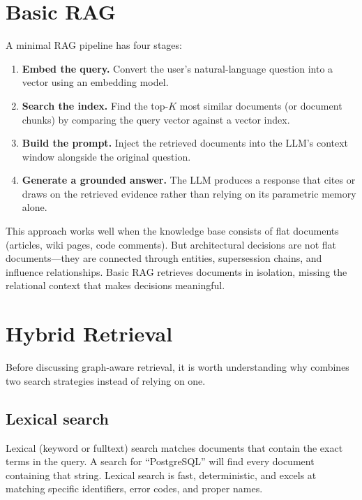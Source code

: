 \section{Basic RAG}
\label{sec:basic-rag}

A minimal RAG pipeline has four stages:

\begin{enumerate}
    \item \textbf{Embed the query.} Convert the user's natural-language
          question into a vector using an embedding model.
    \item \textbf{Search the index.} Find the top-$K$ most similar documents
          (or document chunks) by comparing the query vector against a vector
          index.
    \item \textbf{Build the prompt.} Inject the retrieved documents into the
          LLM's context window alongside the original question.
    \item \textbf{Generate a grounded answer.} The LLM produces a response
          that cites or draws on the retrieved evidence rather than relying on
          its parametric memory alone.
\end{enumerate}

This approach works well when the knowledge base consists of flat documents
(articles, wiki pages, code comments). But architectural decisions are not flat
documents---they are connected through entities, supersession chains, and
influence relationships. Basic RAG retrieves documents in isolation, missing
the relational context that makes decisions meaningful.

\section{Hybrid Retrieval}
\label{sec:hybrid-retrieval}

Before discussing graph-aware retrieval, it is worth understanding why
\sysname{} combines two search strategies instead of relying on one.

\subsection{Lexical search}

Lexical (keyword or fulltext) search matches documents that contain the exact
terms in the query. A search for ``PostgreSQL'' will find every document
containing that string. Lexical search is fast, deterministic, and excels at
matching specific identifiers, error codes, and proper names.

